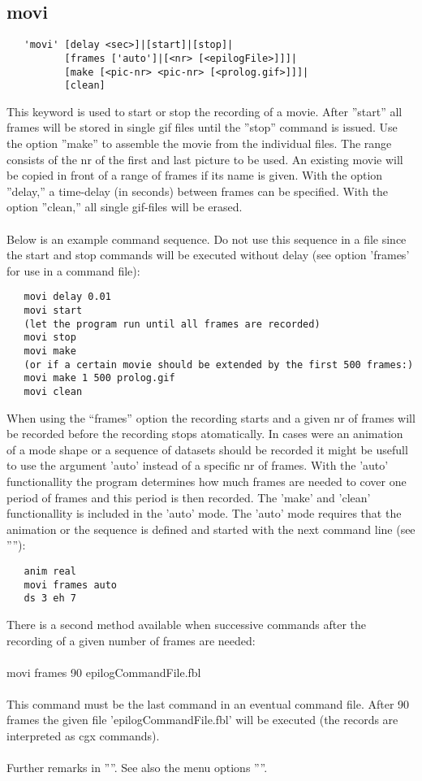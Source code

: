 \documentclass{article}
\begin{document}
\subsection{\label{movi}movi}
\begin{verbatim}
   'movi' [delay <sec>]|[start]|[stop]|
          [frames ['auto']|[<nr> [<epilogFile>]]]|
          [make [<pic-nr> <pic-nr> [<prolog.gif>]]]|
          [clean]
\end{verbatim}
This keyword is used to start or stop the recording of a movie. After ''start'' all frames will be stored in single gif files until the ''stop'' command is issued. Use the option ''make'' to assemble the movie from the individual files. The range consists of the nr of the first and last picture to be used. An existing movie will be copied in front of a range of frames if its name is given. With the option ''delay,'' a time-delay (in seconds) between frames can be specified. With the option ''clean,'' all single gif-files will be erased.\\\\Below is an example command sequence. Do not use this sequence in a file since the start and stop commands will be executed without delay (see option 'frames' for use in a command file):
\begin{verbatim}
   movi delay 0.01
   movi start
   (let the program run until all frames are recorded)
   movi stop
   movi make
   (or if a certain movie should be extended by the first 500 frames:)
   movi make 1 500 prolog.gif
   movi clean 
\end{verbatim}
When using the ``frames'' option the recording starts and a given nr of frames will be recorded before the recording stops atomatically. In cases were an animation of a mode shape or a sequence of datasets should be recorded it might be usefull to use the argument 'auto' instead of a specific nr of frames. With the 'auto' functionallity the program determines how much frames are needed to cover one period of frames and this period is then recorded. The 'make' and 'clean' functionallity is included in the 'auto' mode. The 'auto' mode requires that the animation or the sequence is defined and started with the next command line (see ''''):
\begin{verbatim}
   anim real
   movi frames auto
   ds 3 eh 7
\end{verbatim}
There is a second method available when successive commands after the recording of a given number of frames are needed:\\\\
movi frames 90 epilogCommandFile.fbl\\\\
This command must be the last command in an eventual command file. After 90 frames the given file 'epilogCommandFile.fbl' will be executed (the records are interpreted as cgx commands).\\\\
Further remarks in ''''. See also the menu options ''''. 
\end{document}
